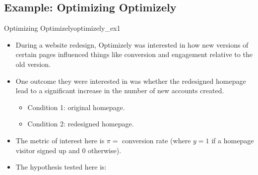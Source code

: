 \subsection{Example: Optimizing Optimizely}
\begin{Example}{Optimizing Optimizely}{optimizely_ex1}
      \begin{itemize}
            \item During a website redesign, Optimizely was interested in how new versions
                  of certain pages influenced things like conversion and engagement relative to the old version.
            \item One outcome they were interested in was whether the redesigned homepage lead to
                  a significant increase in the number of new accounts created.
                  \begin{itemize}
                        \item Condition 1: original homepage.
                        \item Condition 2: redesigned homepage.
                  \end{itemize}
            \item The metric of interest here is $ \pi= $ conversion rate (where $ y=1 $ if a homepage
                  visitor signed up and $ 0 $ otherwise).
            \item The hypothesis tested here is:


\end{itemize}
\end{Example}
